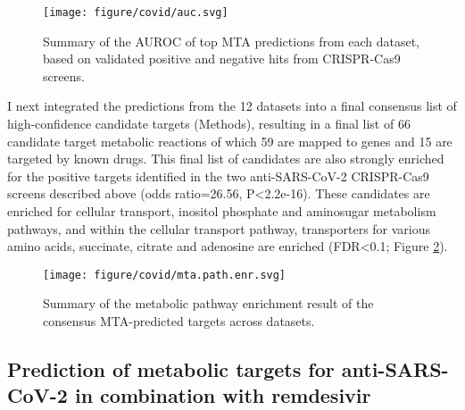 \documentclass[12pt,twoside,openany,\mydriver]{thesis}  %
\begin{document}
\begin{figure}
\texttt{[image: figure/covid/auc.svg]} \caption{Summary of the AUROC of top MTA predictions from each dataset, based on validated positive and negative hits from CRISPR-Cas9 screens.}\label{fig:covid-mta-auroc}
\end{figure}
I next integrated the predictions from the 12 datasets into a final consensus list of high-confidence candidate targets (Methods), resulting in a final list of 66 candidate target metabolic reactions of which 59 are mapped to genes and 15 are targeted by known drugs. This final list of candidates are also strongly enriched for the positive targets identified in the two anti-SARS-CoV-2 CRISPR-Cas9 screens described above (odds ratio=26.56, P\textless{}2.2e-16). These candidates are enriched for cellular transport, inositol phosphate and aminosugar metabolism pathways, and within the cellular transport pathway, transporters for various amino acids, succinate, citrate and adenosine are enriched (FDR\textless{}0.1; Figure \ref{fig:covid-mta-pathway-consensus}).
\begin{figure}
\texttt{[image: figure/covid/mta.path.enr.svg]} \caption{Summary of the metabolic pathway enrichment result of the consensus MTA-predicted targets across datasets.}\label{fig:covid-mta-pathway-consensus}
\end{figure}
\hypertarget{prediction-of-metabolic-targets-for-anti-sars-cov-2-in-combination-with-remdesivir}{%
\subsection{Prediction of metabolic targets for anti-SARS-CoV-2 in combination with remdesivir}\label{prediction-of-metabolic-targets-for-anti-sars-cov-2-in-combination-with-remdesivir}}
\end{document}
